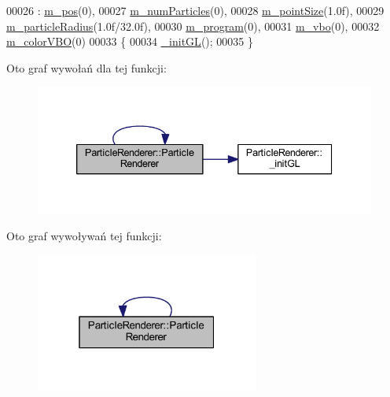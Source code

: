 \begin{DoxyCode}
00026     : \hyperlink{class_particle_renderer_a1d74720edb5c3a13edcdd176ac0d84c7}{m\_pos}(0),
00027       \hyperlink{class_particle_renderer_af885fdb5e6da925209dfd960f66b5fd8}{m\_numParticles}(0),
00028       \hyperlink{class_particle_renderer_a1ca13e546c937cb546c0da19fa853b34}{m\_pointSize}(1.0f),
00029       \hyperlink{class_particle_renderer_aab5ee3cd769a64c45dc9714aabdb0ee2}{m\_particleRadius}(1.0f/32.0f),
00030       \hyperlink{class_particle_renderer_ab8f0dd1a6e0f4401012bd46ae8940648}{m\_program}(0),
00031       \hyperlink{class_particle_renderer_a7549feaa0982abbc44c9fe73f2eb251f}{m\_vbo}(0),
00032       \hyperlink{class_particle_renderer_a7dcaa73a41c598207974432206b423b5}{m\_colorVBO}(0)
00033 \{
00034     \hyperlink{class_particle_renderer_ac75c7f73a0014333305b174b8863a46b}{\_initGL}();
00035 \}
\end{DoxyCode}


Oto graf wywołań dla tej funkcji\-:\nopagebreak
\begin{figure}[H]
\begin{center}
\leavevmode
\includegraphics[width=339pt]{class_particle_renderer_a1718484686c2e6db488cc88c433d03cc_cgraph}
\end{center}
\end{figure}




Oto graf wywoływań tej funkcji\-:\nopagebreak
\begin{figure}[H]
\begin{center}
\leavevmode
\includegraphics[width=208pt]{class_particle_renderer_a1718484686c2e6db488cc88c433d03cc_icgraph}
\end{center}
\end{figure}


